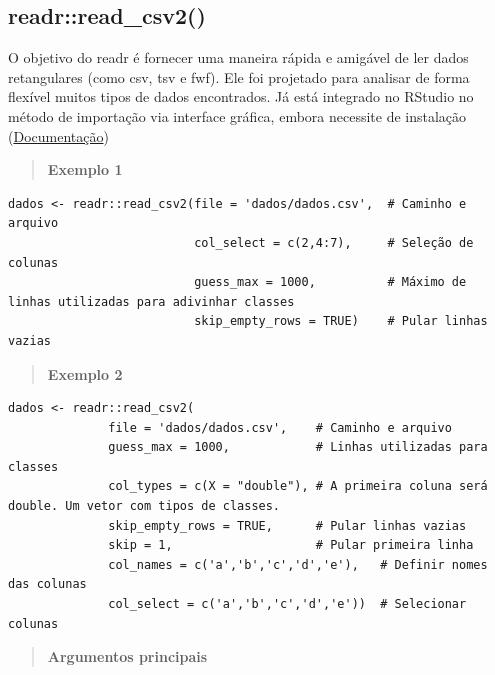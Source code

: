 \documentclass[
]{book}
\theoremstyle{definition}
\theoremstyle{definition}
\theoremstyle{definition}
\theoremstyle{definition}
\theoremstyle{remark}
\begin{document}
\hypertarget{readrread_csv2}{%
\subsection{readr::read\_csv2()}\label{readrread_csv2}}

O objetivo do readr é fornecer uma maneira rápida e amigável de ler dados retangulares (como csv, tsv e fwf). Ele foi projetado para analisar de forma flexível muitos tipos de dados encontrados. Já está integrado no RStudio no método de importação via interface gráfica, embora necessite de instalação (\href{https://www.rdocumentation.org/packages/readr/versions/1.3.1}{Documentação})

\begin{quote}
\textbf{Exemplo 1}
\end{quote}

\begin{verbatim}
dados <- readr::read_csv2(file = 'dados/dados.csv',  # Caminho e arquivo
                          col_select = c(2,4:7),     # Seleção de colunas
                          guess_max = 1000,          # Máximo de linhas utilizadas para adivinhar classes
                          skip_empty_rows = TRUE)    # Pular linhas vazias
\end{verbatim}

\begin{quote}
\textbf{Exemplo 2}
\end{quote}

\begin{verbatim}
dados <- readr::read_csv2(
              file = 'dados/dados.csv',    # Caminho e arquivo
              guess_max = 1000,            # Linhas utilizadas para classes
              col_types = c(X = "double"), # A primeira coluna será double. Um vetor com tipos de classes.
              skip_empty_rows = TRUE,      # Pular linhas vazias
              skip = 1,                    # Pular primeira linha
              col_names = c('a','b','c','d','e'),   # Definir nomes das colunas
              col_select = c('a','b','c','d','e'))  # Selecionar colunas
\end{verbatim}

\begin{quote}
\textbf{Argumentos principais}
\end{quote}
\end{document}
